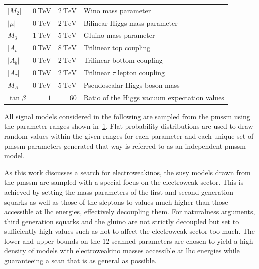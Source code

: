 \begin{table}
\begin{tabular} {l r r l}
		$\vert M_2\vert$ & $\SI{0}{\TeV}$ & $\SI{2}{\TeV}$ & Wino mass parameter \\
		$\vert\mu\vert$ & $\SI{0}{\TeV}$ & $\SI{2}{\TeV}$ & Bilinear Higgs mass parameter \\
		$M_3$ & $\SI{1}{\TeV}$ & $\SI{5}{\TeV}$ & Gluino mass parameter \\
		\midrule
		$\vert A_t\vert$ & $\SI{0}{\TeV}$ & $\SI{8}{\TeV}$ & Trilinear top coupling \\
		$\vert A_b\vert$ & $\SI{0}{\TeV}$ & $\SI{2}{\TeV}$ & Trilinear bottom coupling \\
		$\vert A_\tau\vert$ & $\SI{0}{\TeV}$ & $\SI{2}{\TeV}$ & Trilinear $\tau$ lepton coupling \\
		$M_A$ & $\SI{0}{\TeV}$ & $\SI{5}{\TeV}$ & Pseudoscalar Higgs boson mass \\
		$\tan\beta$ & $1$ & $60$ & Ratio of the Higgs vacuum expectation values \\
		\bottomrule
	\end{tabular}

	\label{fig:pmssm_scan_ranges}   
\end{table}

All signal models considered in the following are sampled from the \gls{pmssm} using the parameter ranges shown in~\cref{fig:pmssm_scan_ranges}. Flat probability distributions are used to draw random values within the given ranges for each parameter and each unique set of \gls{pmssm} parameters generated that way is referred to as an independent \gls{pmssm} model. 

As this work discusses a search for electroweakinos, the \gls{susy} models drawn from the \gls{pmssm} are sampled with a special focus on the electroweak sector.
This is achieved by setting the mass parameters of the first and second generation squarks as well as those of the sleptons to values much higher than those accessible at \gls{lhc} energies, effectively decoupling them.
For naturalness arguments, third generation squarks and the gluino are not strictly decoupled but set to sufficiently high values such as not to affect the electroweak sector too much.
The lower and upper bounds on the 12 scanned parameters are chosen to yield a high density of models with electroweakino masses accessible at \gls{lhc} energies while guaranteeing a scan that is as general as possible. 

